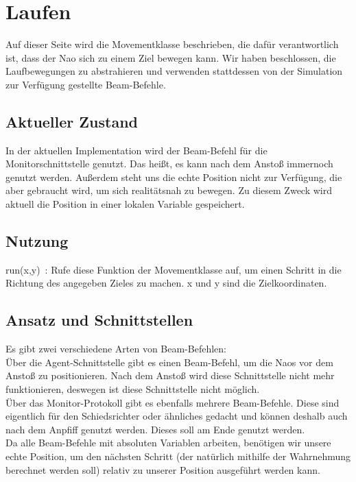 \section{Laufen}
Auf dieser Seite wird die Movementklasse beschrieben, die dafür 
verantwortlich ist, dass der Nao sich zu einem Ziel bewegen kann. Wir 
haben beschlossen, die Laufbewegungen zu abstrahieren und verwenden 
stattdessen von der Simulation zur Verfügung gestellte Beam-Befehle.

\subsection{Aktueller Zustand}
In der aktuellen Implementation wird der Beam-Befehl für die 
Monitorschnittstelle genutzt. Das heißt, es kann nach dem Anstoß immernoch genutzt werden. Außerdem steht uns die echte Position nicht zur 
Verfügung, die aber gebraucht wird, um sich realitätsnah zu bewegen. Zu 
diesem Zweck wird aktuell die Position in einer lokalen Variable 
gespeichert.

\subsection{Nutzung}
run(x,y)~: Rufe diese Funktion der Movementklasse auf, um einen 
Schritt in die Richtung des angegeben Zieles zu machen. x und y sind die
 Zielkoordinaten.

\subsection{Ansatz und Schnittstellen}
Es gibt zwei verschiedene Arten von Beam-Befehlen: \\
Über die Agent-Schnittstelle gibt es einen Beam-Befehl, um die 
Naos vor dem Anstoß zu positionieren. Nach dem Anstoß wird diese 
Schnittstelle nicht mehr funktionieren, deswegen ist diese Schnittstelle 
nicht möglich.\\
Über das Monitor-Protokoll gibt es ebenfalls mehrere 
Beam-Befehle. Diese sind eigentlich für den Schiedsrichter oder 
ähnliches gedacht und können deshalb auch nach dem Anpfiff genutzt 
werden. Dieses soll am Ende genutzt werden.\\
Da alle Beam-Befehle mit absoluten Variablen arbeiten, benötigen 
wir unsere echte Position, um den nächsten Schritt (der natürlich 
mithilfe der Wahrnehmung berechnet werden soll) relativ zu unserer 
Position ausgeführt werden kann.

